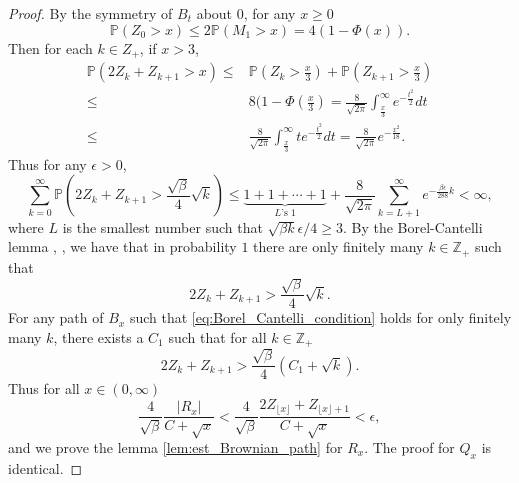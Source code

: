 \documentclass[11pt, a4paper]{article}
\numberwithin{equation}{section}
\newcommand{\intZ}{\mathbb{Z}}
\newcommand{\Prob}{\mathbb{P}}
\theoremstyle{definition}
\theoremstyle{remark}
\begin{document}
\begin{proof}
  By the symmetry of $B_t$ about $0$, for any $x \geq 0$
  \begin{equation} \label{eq:tail_of_Z_0}
    \Prob(Z_0 > x) \leq 2 \Prob(M_1 > x) = 4(1 - \Phi(x)).
  \end{equation}
  Then for each $k \in Z_+$, if $x > 3$,
  \begin{equation}
    \begin{split}
      \Prob(2Z_{k} + Z_{k + 1} > x) \leq {}& \Prob(Z_k > \frac{x}{3}) + \Prob(Z_{k + 1} > \frac{x}{3}) \\
      \leq {}& 8(1 - \Phi(\frac{x}{3}) = \frac{8}{\sqrt{2\pi}} \int^{\infty}_{\frac{x}{3}} e^{-\frac{t^2}{2}} dt \\
      \leq {}& \frac{8}{\sqrt{2\pi}} \int^{\infty}_{\frac{x}{3}} t e^{-\frac{t^2}{2}} dt = \frac{8}{\sqrt{2\pi}} e^{-\frac{x^2}{18}}.
    \end{split}
  \end{equation}
  Thus for any $\epsilon > 0$,
  \begin{equation}
    \sum^{\infty}_{k = 0} \Prob \left( 2Z_{k} + Z_{k + 1} > \frac{\sqrt{\beta}}{4} \sqrt{k} \right) \leq \underbrace{1 + 1 + \dotsb + 1}_{\text{$L$'s $1$}} + \frac{8}{\sqrt{2\pi}} \sum^{\infty}_{k = L + 1}e^{-\frac{\beta \epsilon}{288} k} < \infty,
  \end{equation}
  where $L$ is the smallest number such that $\sqrt{\beta k}\epsilon/4 \geq 3$. By the Borel-Cantelli lemma \cite[Section 4.2]{Chung01}, \cite[Section 2.3]{Durrett10}, we have that in probability $1$ there are only finitely many $k \in \intZ_+$ such that
  \begin{equation} \label{eq:Borel_Cantelli_condition}
    2Z_{k} + Z_{k + 1} > \frac{\sqrt{\beta}}{4} \sqrt{k}.
  \end{equation}
  For any path of $B_x$ such that \eqref{eq:Borel_Cantelli_condition} holds for only finitely many $k$, there exists a $C_1$ such that for all $k \in \intZ_+$
  \begin{equation}
    2Z_{k} + Z_{k + 1} > \frac{\sqrt{\beta}}{4} (C_1 + \sqrt{k}).
  \end{equation}
  Thus for all $x \in (0, \infty)$
  \begin{equation}
    \frac{4}{\sqrt{\beta}} \frac{\lvert R_x \rvert}{C + \sqrt{x}}  < \frac{4}{\sqrt{\beta}} \frac{2Z_{\lfloor x \rfloor} + Z_{\lfloor x \rfloor + 1}}{C + \sqrt{x}} < \epsilon,
  \end{equation}
  and  we prove the lemma \ref{lem:est_Brownian_path} for $R_x$. The proof for $Q_x$ is identical.
\end{proof}
\end{document}
